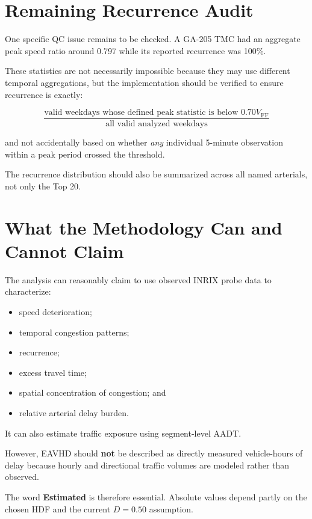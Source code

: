 \documentclass[11pt]{article}
\begin{document}
\section{Remaining Recurrence Audit}

One specific QC issue remains to be checked. A GA-205 TMC had an aggregate peak speed ratio around 0.797 while its reported recurrence was 100\%.

These statistics are not necessarily impossible because they may use different temporal aggregations, but the implementation should be verified to ensure recurrence is exactly:

\[
\boxed{
\frac{\text{valid weekdays whose defined peak statistic is below }0.70V_{\mathrm{FF}}}
{\text{all valid analyzed weekdays}}
}
\]

and not accidentally based on whether \emph{any} individual 5-minute observation within a peak period crossed the threshold.

The recurrence distribution should also be summarized across all named arterials, not only the Top 20.

\section{What the Methodology Can and Cannot Claim}

The analysis can reasonably claim to use observed INRIX probe data to characterize:

\begin{itemize}
    \item speed deterioration;
    \item temporal congestion patterns;
    \item recurrence;
    \item excess travel time;
    \item spatial concentration of congestion; and
    \item relative arterial delay burden.
\end{itemize}

It can also estimate traffic exposure using segment-level AADT.

However, EAVHD should \textbf{not} be described as directly measured vehicle-hours of delay because hourly and directional traffic volumes are modeled rather than observed.

The word \textbf{Estimated} is therefore essential. Absolute values depend partly on the chosen HDF and the current $D=0.50$ assumption.
\end{document}
